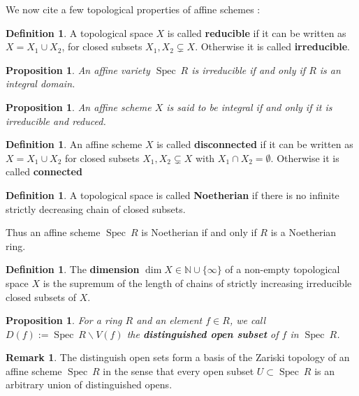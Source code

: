 \documentclass{article}
\theoremstyle{plain}
\newtheorem{proposition}[theorem]{Proposition}
\theoremstyle{definition}
\newtheorem{definition}[theorem]{Definition}
\newtheorem{remark}{Remark}
\DeclareMathOperator{\Spec}{Spec}
\begin{document}
\noindent We now cite a few topological properties of affine schemes :

\begin{definition}
    A topological space $X$ is called \textbf{reducible} if it can be written as $X = X_1 \cup X_2$, for closed subsets $X_1,X_2 \subsetneq X$. Otherwise it is called \textbf{irreducible}.
\end{definition}



\begin{proposition}
    An affine variety $\Spec\: R$ is irreducible if and only if $R$ is an integral domain.
\end{proposition}
\begin{proposition}
\label{integral_iff_irr_red}
    An affine scheme $X$ is said to be integral if and only if it is irreducible and reduced.
\end{proposition}



\begin{definition}
    An affine scheme $X$ is called \textbf{disconnected} if it can be written as $X=X_1\cup X_2$ for closed subsets $X_1,X_2\subsetneq X$ with $X_1\cap X_2 = \emptyset$. Otherwise it is called \textbf{connected}
\end{definition}

\begin{definition}
    A topological space is called \textbf{Noetherian} if there is no infinite strictly decreasing chain of closed subsets.
\end{definition}

\noindent Thus an affine scheme $\Spec\: R$ is Noetherian if and only if $R$ is a Noetherian ring.


\begin{definition}
    The \textbf{dimension} $\dim X\in \mathbb{N}\cup \{\infty\}$ of a non-empty topological space $X$ is the supremum of the length of chains of strictly increasing irreducible closed subsets of $X$.
\end{definition}

\begin{proposition}
    For a ring $R$ and an element $f\in R$, we call $D(f) := \Spec\:R \backslash V(f)$ the \textbf{distinguished open subset} of $f$ in $\Spec\: R$.
\end{proposition}
\begin{remark}
    The distinguish open sets form a basis of the Zariski topology of an affine scheme $\Spec\:R$ in the sense that every open subset $U\subset \Spec\:R$ is an arbitrary union of distinguished opens.
\end{remark}
\end{document}

